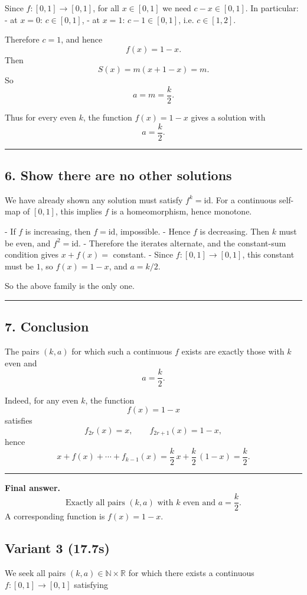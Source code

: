 \documentclass[12pt,a4paper]{article}
\begin{document}
Since \(f:[0,1]\to[0,1]\), for all \(x\in[0,1]\) we need \(c-x\in[0,1]\). In particular:
- at \(x=0\): \(c\in[0,1]\),
- at \(x=1\): \(c-1\in[0,1]\), i.e. \(c\in[1,2]\).

Therefore \(c=1\), and hence
\[
f(x)=1-x.
\]
Then
\[
S(x)=m(x+1-x)=m.
\]
So
\[
a=m=\frac k2.
\]

Thus for every even \(k\), the function \(f(x)=1-x\) gives a solution with
\[
a=\frac k2.
\]


\medskip\hrule\medskip


\subsection*{6. Show there are no other solutions}

We have already shown any solution must satisfy \(f^k=\mathrm{id}\). For a continuous self-map of \([0,1]\), this implies \(f\) is a homeomorphism, hence monotone.

- If \(f\) is increasing, then \(f=\mathrm{id}\), impossible.
- Hence \(f\) is decreasing. Then \(k\) must be even, and \(f^2=\mathrm{id}\).
- Therefore the iterates alternate, and the constant-sum condition gives \(x+f(x)=\) constant.
- Since \(f:[0,1]\to[0,1]\), this constant must be \(1\), so \(f(x)=1-x\), and \(a=k/2\).

So the above family is the only one.


\medskip\hrule\medskip


\subsection*{7. Conclusion}

The pairs \((k,a)\) for which such a continuous \(f\) exists are exactly those with \(k\) even and
\[
a=\frac k2.
\]

Indeed, for any even \(k\), the function
\[
f(x)=1-x
\]
satisfies
\[
f_{2r}(x)=x,\qquad f_{2r+1}(x)=1-x,
\]
hence
\[
x+f(x)+\cdots+f_{k-1}(x)=\frac k2\,x+\frac k2\,(1-x)=\frac k2.
\]


\medskip\hrule\medskip


\textbf{Final answer.}  
\[
\boxed{\text{Exactly all pairs }(k,a)\text{ with }k\text{ even and }a=\frac{k}{2}.}
\]
A corresponding function is \(\boxed{f(x)=1-x}\).
\newpage
\subsection{Variant 3 (17.7s)}
We seek all pairs \((k,a)\in \mathbb N\times \mathbb R\) for which there exists a continuous \(f:[0,1]\to[0,1]\) satisfying
\end{document}

